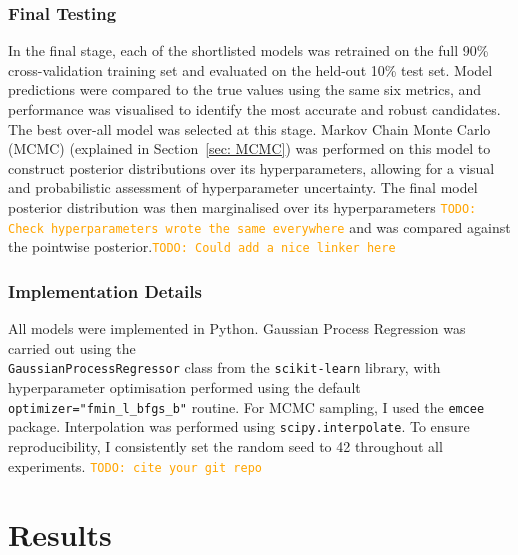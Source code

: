 \documentclass{ucdgradtaughtthesis}
\newcommand{\todo}[1]{\textcolor{orange}{\texttt{TODO: #1}}}
\begin{document}
 \subsection{Final Testing}
In the final stage, each of the shortlisted models was retrained on the full 90\% cross-validation training set and evaluated on the held-out 10\% test set. Model predictions were compared to the true values using the same six metrics, and performance was visualised to identify the most accurate and robust candidates.
The best over-all model was selected at this stage. Markov Chain Monte Carlo (MCMC) (explained in Section~\ref{sec: MCMC}) was performed on this model
to construct posterior distributions over its hyperparameters, allowing for a visual and probabilistic assessment of hyperparameter uncertainty. 
The final model posterior distribution was then marginalised over its hyperparameters \todo{Check hyperparameters wrote the same everywhere} and was
compared against the pointwise posterior.\todo{Could add a nice linker here} 
 

\subsection{Implementation Details}
\label{subsubsec:implementdetails}
All models were implemented in Python. Gaussian Process Regression was carried out using the \\
\texttt{GaussianProcessRegressor} class from the \texttt{scikit-learn} library, with hyperparameter optimisation performed using the 
default \texttt{optimizer="fmin\_l\_bfgs\_b"} routine. 
For MCMC sampling, I used the \texttt{emcee} package. Interpolation was performed using \texttt{scipy.interpolate}. 
To ensure reproducibility, I consistently set the random seed to 42 throughout all experiments. \todo{cite your git repo}
%
%
%
\chapter{Results}
\end{document}

